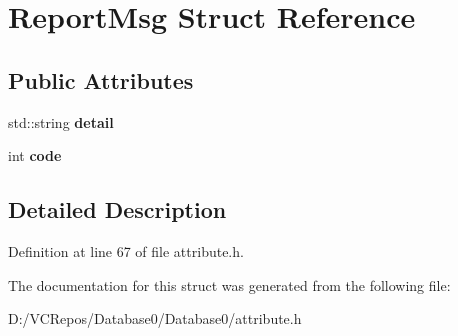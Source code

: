 \hypertarget{struct_report_msg}{}\section{Report\+Msg Struct Reference}
\label{struct_report_msg}
\subsection*{Public Attributes}
\begin{DoxyCompactItemize}
\item 
\mbox{\label{struct_report_msg_a9be14c51bd85ade2932ab0b6aaf48d4f}} 
std\+::string {\bfseries detail}
\item 
\mbox{\label{struct_report_msg_aeb13278d5071030dd5abba7cb0a39b6e}} 
int {\bfseries code}
\end{DoxyCompactItemize}


\subsection{Detailed Description}


Definition at line 67 of file attribute.\+h.



The documentation for this struct was generated from the following file\+:\begin{DoxyCompactItemize}
\item 
D\+:/\+V\+C\+Repos/\+Database0/\+Database0/attribute.\+h\end{DoxyCompactItemize}
